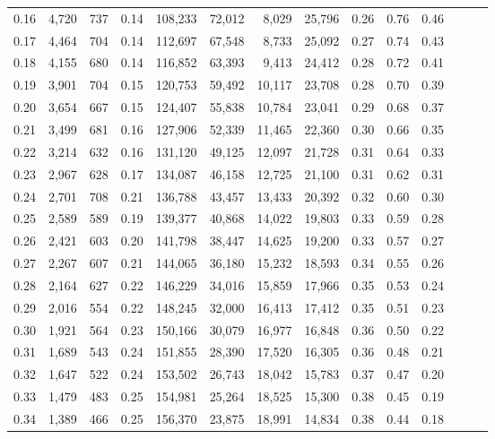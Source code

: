 \begin{tabular}{rrrrrrrrrrrrrr}
0.16 &  4,720 &  737 &  0.14 &  108,233 &   72,012 &   8,029 &  25,796 &  0.26 &  0.76 &      0.46 \\
0.17 &  4,464 &  704 &  0.14 &  112,697 &   67,548 &   8,733 &  25,092 &  0.27 &  0.74 &      0.43 \\
0.18 &  4,155 &  680 &  0.14 &  116,852 &   63,393 &   9,413 &  24,412 &  0.28 &  0.72 &      0.41 \\
0.19 &  3,901 &  704 &  0.15 &  120,753 &   59,492 &  10,117 &  23,708 &  0.28 &  0.70 &      0.39 \\
0.20 &  3,654 &  667 &  0.15 &  124,407 &   55,838 &  10,784 &  23,041 &  0.29 &  0.68 &      0.37 \\
0.21 &  3,499 &  681 &  0.16 &  127,906 &   52,339 &  11,465 &  22,360 &  0.30 &  0.66 &      0.35 \\
0.22 &  3,214 &  632 &  0.16 &  131,120 &   49,125 &  12,097 &  21,728 &  0.31 &  0.64 &      0.33 \\
0.23 &  2,967 &  628 &  0.17 &  134,087 &   46,158 &  12,725 &  21,100 &  0.31 &  0.62 &      0.31 \\
0.24 &  2,701 &  708 &  0.21 &  136,788 &   43,457 &  13,433 &  20,392 &  0.32 &  0.60 &      0.30 \\
0.25 &  2,589 &  589 &  0.19 &  139,377 &   40,868 &  14,022 &  19,803 &  0.33 &  0.59 &      0.28 \\
0.26 &  2,421 &  603 &  0.20 &  141,798 &   38,447 &  14,625 &  19,200 &  0.33 &  0.57 &      0.27 \\
0.27 &  2,267 &  607 &  0.21 &  144,065 &   36,180 &  15,232 &  18,593 &  0.34 &  0.55 &      0.26 \\
0.28 &  2,164 &  627 &  0.22 &  146,229 &   34,016 &  15,859 &  17,966 &  0.35 &  0.53 &      0.24 \\
0.29 &  2,016 &  554 &  0.22 &  148,245 &   32,000 &  16,413 &  17,412 &  0.35 &  0.51 &      0.23 \\
0.30 &  1,921 &  564 &  0.23 &  150,166 &   30,079 &  16,977 &  16,848 &  0.36 &  0.50 &      0.22 \\
0.31 &  1,689 &  543 &  0.24 &  151,855 &   28,390 &  17,520 &  16,305 &  0.36 &  0.48 &      0.21 \\
0.32 &  1,647 &  522 &  0.24 &  153,502 &   26,743 &  18,042 &  15,783 &  0.37 &  0.47 &      0.20 \\
0.33 &  1,479 &  483 &  0.25 &  154,981 &   25,264 &  18,525 &  15,300 &  0.38 &  0.45 &      0.19 \\
0.34 &  1,389 &  466 &  0.25 &  156,370 &   23,875 &  18,991 &  14,834 &  0.38 &  0.44 &      0.18 \\

\end{tabular}
